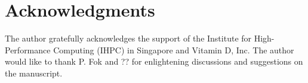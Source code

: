 \documentclass[oneeqnum,onefignum,onetabnum,onethmnum]{siamltex}
\begin{document}
\section*{Acknowledgments}
The author gratefully acknowledges the support of the Institute for 
High-Performance Computing (IHPC) in Singapore and Vitamin D, Inc.
The author would like to thank P. Fok and ?? for enlightening discussions 
and suggestions on the manuscript.


\end{document}
